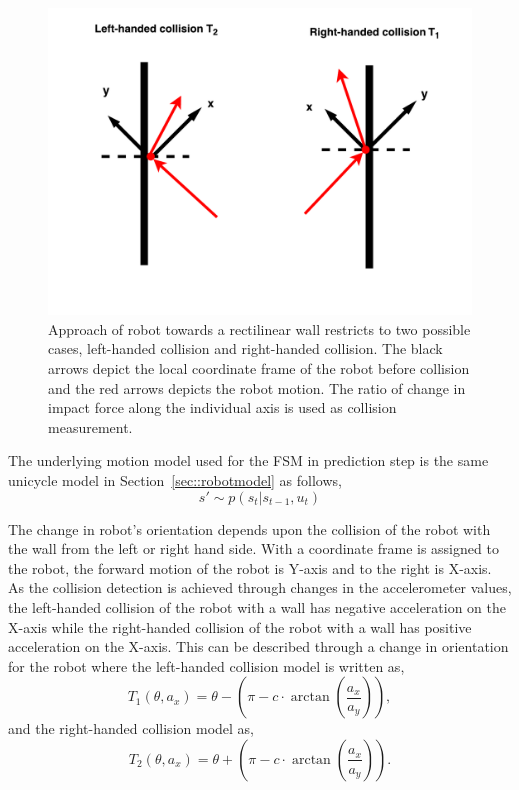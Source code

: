 \begin{figure}
\centering
\includegraphics[scale=0.6]{./images/collision_ball}
\caption[Types of collision generation in impact-based SLAM]{Approach of robot towards a rectilinear wall restricts to two possible cases, left-handed collision and right-handed collision. The black arrows depict the local coordinate frame of the robot before collision and the red arrows depicts the robot motion. The ratio of change in impact force along the individual axis is used as collision measurement.}
\label{collision_ball}
\end{figure}

The underlying motion model used for the FSM in prediction step is the same unicycle model in Section~\ref{sec::robotmodel} as follows,
\begin{equation}
s'\sim p(s_t|s_{t-1},u_t)
\end{equation}

The change in robot's orientation depends upon the collision of the robot with the wall from the left or right hand side. With a coordinate frame is assigned to the robot, the forward motion of the robot is Y-axis and to the right is X-axis. As the collision detection is achieved through changes in the accelerometer values, the left-handed collision of the robot with a wall has negative acceleration on the X-axis while the right-handed collision of the robot with a wall has positive acceleration on the X-axis. This can be described through a change in orientation for the robot where the left-handed collision model is written as,
\begin{equation}
T_1(\theta,a_x)=\theta-\left(\pi-c\cdot\arctan\left(\frac{a_x}{a_y}\right)\right),
\label{t1_orientation}
\end{equation}
and the right-handed collision model as,
\begin{equation}
T_2(\theta,a_x)=\theta+\left(\pi-c\cdot\arctan\left(\frac{a_x}{a_y}\right)\right).
\label{t2_orientation}
\end{equation}

